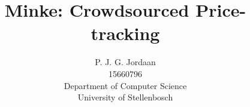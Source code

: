 \documentclass[10pt,a4paper]{article}
\author{P. J. G. Jordaan \\
15660796 \\
Department of Computer Science \\
University of Stellenbosch}
\title{Minke: Crowdsourced Price-tracking}
\date{}
\begin{document}
\maketitle
\pagebreak









\end{document}
